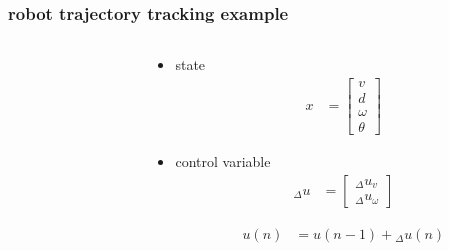 \documentclass{beamer}
\begin{document}
\begin{frame}
  
  \frametitle{\textbf { robot trajectory tracking example}}
 
  \begin{columns}

    \begin{column}{0.5\textwidth}
    \end{column}

    \begin{column}{0.5\textwidth}
      \begin{itemize}
        \item state
          \begin{align*}
            x &=
            \begin{bmatrix}
              v \\
              d \\
              \omega \\
              \theta
            \end{bmatrix}
          \end{align*}


        \item control variable
          \begin{align*}
            _\Delta u &=
            \begin{bmatrix}
              _\Delta u_v \\
              _\Delta u_{\omega}
            \end{bmatrix}
          \end{align*}

          \begin{align*}
            u(n) &= u(n-1) +{_\Delta}u(n)
          \end{align*}

      \end{itemize}
    \end{column}

  \end{columns}

\end{frame}
\end{document}
